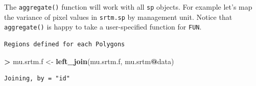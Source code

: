 \documentclass[
]{krantz}
\makeatletter
\newenvironment{Shaded}{\begin{snugshade}}{\end{snugshade}}
\newcommand{\ControlFlowTok}[1]{\textcolor[rgb]{0.27,0.27,0.27}{\textbf{#1}}}
\newcommand{\DataTypeTok}[1]{\textcolor[rgb]{0.27,0.27,0.27}{#1}}
\newcommand{\ErrorTok}[1]{\textcolor[rgb]{0.14,0.14,0.14}{\textbf{#1}}}
\newcommand{\KeywordTok}[1]{\textcolor[rgb]{0.27,0.27,0.27}{\textbf{#1}}}
\newcommand{\NormalTok}[1]{#1}
\newcommand{\OperatorTok}[1]{\textcolor[rgb]{0.43,0.43,0.43}{\textbf{#1}}}
\newcommand{\StringTok}[1]{\textcolor[rgb]{0.5,0.5,0.5}{#1}}
\newenvironment{kframe}{%
\medskip{}
\setlength{\fboxsep}{.8em}
 \def\at@end@of@kframe{}%
 \ifinner\ifhmode%
  \def\at@end@of@kframe{\end{minipage}}%
  \begin{minipage}{\columnwidth}%
 \fi\fi%
 \def\FrameCommand##1{\hskip\@totalleftmargin \hskip-\fboxsep
 \colorbox{shadecolor}{##1}\hskip-\fboxsep
     \hskip-\linewidth \hskip-\@totalleftmargin \hskip\columnwidth}%
 \MakeFramed {\advance\hsize-\width
   \@totalleftmargin\z@ \linewidth\hsize
   \@setminipage}}%
 {\par\unskip\endMakeFramed%
 \at@end@of@kframe}
\renewenvironment{Shaded}{\begin{kframe}}{\end{kframe}}
\makeatother
\begin{document}
The \texttt{aggregate()} function will work with all \texttt{sp} objects. For example let's map the variance of pixel values in \texttt{srtm.sp} by management unit. Notice that \texttt{aggregate()} is happy to take a user-specified function for \texttt{FUN}.

\begin{Shaded}
\end{Shaded}

\begin{verbatim}
Regions defined for each Polygons
\end{verbatim}

\begin{Shaded}
\begin{Highlighting}[]
\OperatorTok{\textgreater{}}\StringTok{ }\NormalTok{mu.srtm.f \textless{}{-}}\StringTok{ }\KeywordTok{left\_join}\NormalTok{(mu.srtm.f, mu.srtm}\OperatorTok{@}\NormalTok{data)}
\end{Highlighting}
\end{Shaded}

\begin{verbatim}
Joining, by = "id"
\end{verbatim}
\end{document}
